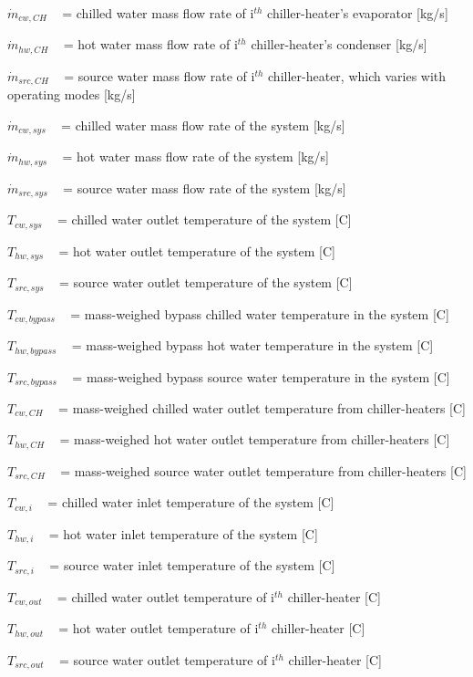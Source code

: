 \({\dot m_{cw,CH}}\) ~ = chilled water mass flow rate of i\(^{th}\) chiller-heater's evaporator {[}kg/s{]}

\({\dot m_{hw,CH}}\) ~ = hot water mass flow rate of i\(^{th}\) chiller-heater's condenser {[}kg/s{]}

\({\dot m_{src,CH}}\) ~ = source water mass flow rate of i\(^{th}\) chiller-heater, which varies with operating modes {[}kg/s{]}

\({\dot m_{cw,sys}}\) ~ = chilled water mass flow rate of the system {[}kg/s{]}

\({\dot m_{hw,sys}}\) ~ = hot water mass flow rate of the system {[}kg/s{]}

\({\dot m_{src,sys}}\) ~ = source water mass flow rate of the system {[}kg/s{]}

\({T_{cw,sys}}\) ~ = chilled water outlet temperature of the system {[}C{]}

\({T_{hw,sys}}\) ~ = hot water outlet temperature of the system {[}C{]}

\({T_{src,sys}}\) ~ = source water outlet temperature of the system {[}C{]}

\({T_{cw,bypass}}\) ~ = mass-weighed bypass chilled water temperature in the system {[}C{]}

\({T_{hw,bypass}}\) ~ = mass-weighed bypass hot water temperature in the system {[}C{]}

\({T_{src,bypass}}\) ~ = mass-weighed bypass source water temperature in the system {[}C{]}

\({T_{cw,CH}}\) ~ = mass-weighed chilled water outlet temperature from chiller-heaters {[}C{]}

\({T_{hw,CH}}\) ~ = mass-weighed hot water outlet temperature from chiller-heaters {[}C{]}

\({T_{src,CH}}\) ~ = mass-weighed source water outlet temperature from chiller-heaters {[}C{]}

\({T_{cw,i}}\) ~ = chilled water inlet temperature of the system {[}C{]}

\({T_{hw,i}}\) ~ = hot water inlet temperature of the system {[}C{]}

\({T_{src,i}}\) ~ = source water inlet temperature of the system {[}C{]}

\({T_{cw,out}}\) ~ = chilled water outlet temperature of i\(^{th}\) chiller-heater {[}C{]}

\({T_{hw,out}}\) ~ = hot water outlet temperature of i\(^{th}\) chiller-heater {[}C{]}

\({T_{src,out}}\) ~ = source water outlet temperature of i\(^{th}\) chiller-heater {[}C{]}

